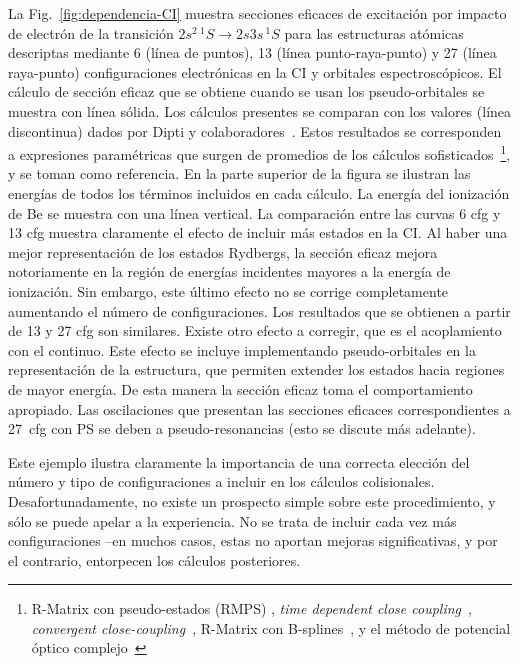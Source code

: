 La Fig.~\ref{fig:dependencia-CI} muestra secciones eficaces de 
excitación por impacto de electrón de la transición 
$2s^2\,^1S\rightarrow 2s3s\,^1S$ para las estructuras atómicas 
descriptas mediante 6 (línea de puntos), 13 (línea punto-raya-punto) y 
27 (línea raya-punto) configuraciones electrónicas en la CI y 
orbitales espectroscópicos. El cálculo de sección eficaz que se obtiene 
cuando se usan los pseudo-orbitales se muestra con línea sólida. 
Los cálculos presentes se comparan con los valores (línea discontinua) 
dados por Dipti y colaboradores~\cite{Dipti:19}. Estos resultados se 
corresponden a expresiones paramétricas que surgen de promedios de los 
cálculos sofisticados~\footnote{R-Matrix con pseudo-estados (RMPS) 
\cite{Be_Ballance:03,Bartschat:97}, \textit{time dependent close 
coupling}~\cite{Colgan:03}, \textit{convergent 
close-coupling}~\cite{Fursa:97,Bray:15}, R-Matrix con 
B-splines~\cite{Zatsarinny:16}, y el método de potencial óptico 
complejo~\cite{Blanco:17}}, y se toman como referencia. 
En la parte superior de la figura se ilustran las energías de todos los 
términos incluidos en cada cálculo. La energía del ionización de Be se 
muestra con una línea vertical. 
La comparación entre las curvas 6 cfg y 13 cfg muestra claramente el 
efecto de incluir más estados en la CI. Al haber una mejor 
representación de los estados Rydbergs, la sección eficaz mejora 
notoriamente en la región de energías incidentes mayores a la energía de 
ionización. Sin embargo, este último efecto no se corrige completamente
aumentando el número de configuraciones. Los resultados que se obtienen
a partir de 13 y 27 cfg son similares. Existe otro efecto a corregir, 
que es el acoplamiento con el continuo. Este efecto se incluye 
implementando pseudo-orbitales en la representación de la estructura, 
que permiten extender los estados hacia regiones de mayor energía. De 
esta manera la sección eficaz toma el comportamiento apropiado. Las 
oscilaciones que presentan las secciones eficaces correspondientes a 
27~cfg con PS se deben a pseudo-resonancias (esto se discute más 
adelante). 

Este ejemplo ilustra claramente la importancia de una correcta elección 
del número y tipo de configuraciones a incluir en los cálculos 
colisionales. Desafortunadamente, no existe un prospecto simple sobre 
este procedimiento, y sólo se puede apelar a la experiencia. No se trata 
de incluir cada vez más configuraciones --en muchos casos, estas no 
aportan mejoras significativas, y por el contrario, entorpecen los 
cálculos posteriores. 


